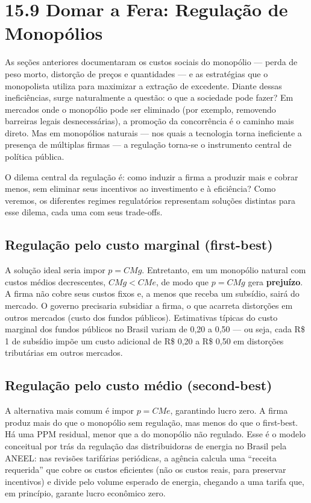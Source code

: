 \documentclass[11pt,twoside,openright]{book}
\begin{document}
\section{15.9 Domar a Fera: Regulação de Monopólios}\label{159}

As seções anteriores documentaram os custos sociais do monopólio ---
perda de peso morto, distorção de preços e quantidades --- e as
estratégias que o monopolista utiliza para maximizar a extração de
excedente. Diante dessas ineficiências, surge naturalmente a questão: o
que a sociedade pode fazer? Em mercados onde o monopólio pode ser
eliminado (por exemplo, removendo barreiras legais desnecessárias), a
promoção da concorrência é o caminho mais direto. Mas em monopólios
naturais --- nos quais a tecnologia torna ineficiente a presença de
múltiplas firmas --- a regulação torna-se o instrumento central de
política pública.

O dilema central da regulação é: como induzir a firma a produzir mais e
cobrar menos, sem eliminar seus incentivos ao investimento e à
eficiência? Como veremos, os diferentes regimes regulatórios representam
soluções distintas para esse dilema, cada uma com seus trade-offs.

\subsection{Regulação pelo custo marginal
(first-best)}\label{regulauxe7uxe3o-pelo-custo-marginal-first-best}

A solução ideal seria impor \(p = CMg\). Entretanto, em um monopólio
natural com custos médios decrescentes, \(CMg < CMe\), de modo que
\(p = CMg\) gera \textbf{prejuízo}. A firma não cobre seus custos fixos
e, a menos que receba um subsídio, sairá do mercado. O governo
precisaria subsidiar a firma, o que acarreta distorções em outros
mercados (custo dos fundos públicos). Estimativas típicas do custo
marginal dos fundos públicos no Brasil variam de 0,20 a 0,50 --- ou
seja, cada R\$ 1 de subsídio impõe um custo adicional de R\$ 0,20 a R\$
0,50 em distorções tributárias em outros mercados.

\subsection{Regulação pelo custo médio
(second-best)}\label{regulauxe7uxe3o-pelo-custo-muxe9dio-second-best}

A alternativa mais comum é impor \(p = CMe\), garantindo lucro zero. A
firma produz mais do que o monopólio sem regulação, mas menos do que o
first-best. Há uma PPM residual, menor que a do monopólio não regulado.
Esse é o modelo conceitual por trás da regulação das distribuidoras de
energia no Brasil pela ANEEL: nas revisões tarifárias periódicas, a
agência calcula uma ``receita requerida'' que cobre os custos eficientes
(não os custos reais, para preservar incentivos) e divide pelo volume
esperado de energia, chegando a uma tarifa que, em princípio, garante
lucro econômico zero.
\end{document}
